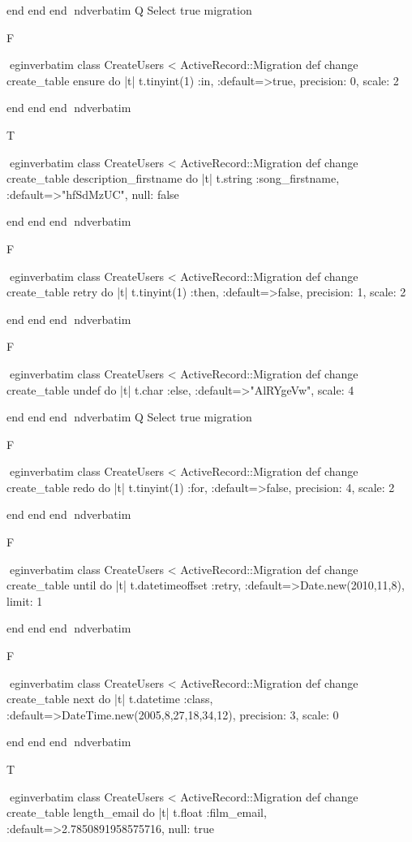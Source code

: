     end 
  end 
end
nd{verbatim}
Q
 Select true migration

F

egin{verbatim}
 class CreateUsers < ActiveRecord::Migration 
  def change 
    create_table ensure do |t| 
      t.tinyint(1) :in, :default=>true, precision: 0, scale: 2
    
    end 
  end 
end
nd{verbatim}

T

egin{verbatim}
 class CreateUsers < ActiveRecord::Migration 
  def change 
    create_table description_firstname do |t| 
      t.string :song_firstname, :default=>"hfSdMzUC", null: false
    
    end 
  end 
end
nd{verbatim}

F

egin{verbatim}
 class CreateUsers < ActiveRecord::Migration 
  def change 
    create_table retry do |t| 
      t.tinyint(1) :then, :default=>false, precision: 1, scale: 2
    
    end 
  end 
end
nd{verbatim}

F

egin{verbatim}
 class CreateUsers < ActiveRecord::Migration 
  def change 
    create_table undef do |t| 
      t.char :else, :default=>"AlRYgeVw", scale: 4
    
    end 
  end 
end
nd{verbatim}
Q
 Select true migration

F

egin{verbatim}
 class CreateUsers < ActiveRecord::Migration 
  def change 
    create_table redo do |t| 
      t.tinyint(1) :for, :default=>false, precision: 4, scale: 2
    
    end 
  end 
end
nd{verbatim}

F

egin{verbatim}
 class CreateUsers < ActiveRecord::Migration 
  def change 
    create_table until do |t| 
      t.datetimeoffset :retry, :default=>Date.new(2010,11,8), limit: 1
    
    end 
  end 
end
nd{verbatim}

F

egin{verbatim}
 class CreateUsers < ActiveRecord::Migration 
  def change 
    create_table next do |t| 
      t.datetime :class, :default=>DateTime.new(2005,8,27,18,34,12), precision: 3, scale: 0
    
    end 
  end 
end
nd{verbatim}

T

egin{verbatim}
 class CreateUsers < ActiveRecord::Migration 
  def change 
    create_table length_email do |t| 
      t.float :film_email, :default=>2.7850891958575716, null: true
    
